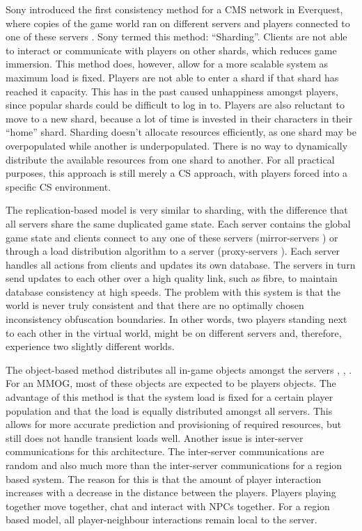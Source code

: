 \documentclass[journal,oneside,a4paper,onecolumn]{IEEEtran}
\begin{document}
Sony introduced the first consistency method for a \ac{CMS} network in Everquest, where copies of the game world ran on different servers and players connected to one of these servers \cite{engineering_everquest}. Sony termed this method: ``Sharding''. Clients are not able to interact or communicate with players on other shards, which reduces game immersion. This method does, however, allow for a more scalable system as maximum load is fixed. Players are not able to enter a shard if that shard has reached it capacity. This has in the past caused unhappiness amongst players, since popular shards could be difficult to log in to. Players are also reluctant to move to a new shard, because a lot of time is invested in their characters in their ``home'' shard. Sharding doesn't allocate resources efficiently, as one shard may be overpopulated while another is underpopulated. There is no way to dynamically distribute the available resources from one shard to another. For all practical purposes, this approach is still merely a \ac{CS} approach, with players forced into a specific \ac{CS} environment.

The replication-based model is very similar to sharding, with the difference that all servers share the same duplicated game state. Each server contains the global game state and clients connect to any one of these servers (mirror-servers \cite{mirrored_server}) or through a load distribution algorithm to a server (proxy-servers \cite{proxy_server_dist}). Each server handles all actions from clients and updates its own database. The servers in turn send updates to each other over a high quality link, such as fibre, to maintain database consistency at high speeds. The problem with this system is that the world is never truly consistent and that there are no optimally chosen inconsistency obfuscation boundaries. In other words, two players standing next to each other in the virtual world, might be on different servers and, therefore, experience two slightly different worlds.

The object-based method distributes all in-game objects amongst the servers \cite{object_based_consistency1}, \cite{object_based_consistency2}, \cite{object_based_consistency3}. For an MMOG, most of these objects are expected to be players objects. The advantage of this method is that the system load is fixed for a certain player population and that the load is equally distributed amongst all servers. This allows for more accurate prediction and provisioning  of required resources, but still does not handle transient loads well. Another issue is inter-server communications for this architecture. The inter-server communications are random and also much more than the inter-server communications for a region based system. The reason for this is that the amount of player interaction increases with a decrease in the distance between the players. Players playing together move together, chat and interact with \acp{NPC} together. For a region based model, all player-neighbour interactions remain local to the server.
\end{document}
